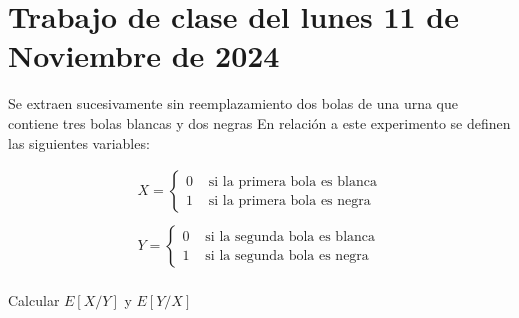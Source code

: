 \section{Trabajo de clase del lunes 11 de Noviembre de 2024}
 
\begin{ejercicio}
    Se extraen sucesivamente sin reemplazamiento dos bolas de una urna que contiene tres bolas blancas y dos negras En relación a este experimento se definen las siguientes variables:

    \begin{align*}
        X= \left\{
        \begin{array}{cl}
            0 & \text{ si la primera bola es blanca}\\
            1 & \text{ si la primera bola es negra}
        \end{array}
        \right.\\\\
        Y= \left\{
        \begin{array}{cl}
            0 & \text{ si la segunda bola es blanca}\\
            1 & \text{ si la segunda bola es negra}
        \end{array}
        \right.\\
    \end{align*}

    Calcular $E[X/Y]$ y $E[Y/X]$
    \endsquare


\end{ejercicio}
